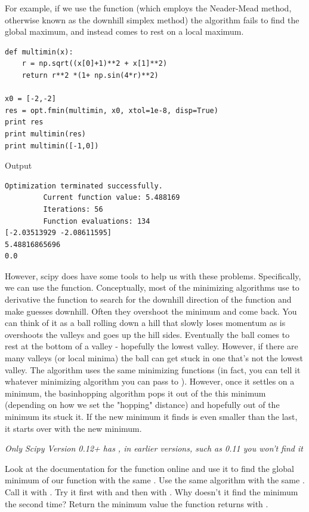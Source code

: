For example, if we use the  function (which employs the Neader-Mead method, otherwise known as the downhill simplex method) the algorithm fails to find the global maximum, and instead comes to rest on a local maximum.
\begin{lstlisting}
def multimin(x):
    r = np.sqrt((x[0]+1)**2 + x[1]**2)
    return r**2 *(1+ np.sin(4*r)**2)

x0 = [-2,-2]
res = opt.fmin(multimin, x0, xtol=1e-8, disp=True)
print res
print multimin(res)
print multimin([-1,0])
\end{lstlisting}
Output
\begin{lstlisting}
Optimization terminated successfully.
         Current function value: 5.488169
         Iterations: 56
         Function evaluations: 134
[-2.03513929 -2.08611595]
5.48816865696
0.0
\end{lstlisting}

However, scipy does have some tools to help us with these problems. Specifically, we can use the  function. 
Conceptually, most of the minimizing algorithms use to derivative the function to search for the downhill direction of the function and make guesses downhill. Often they overshoot the minimum and come back. You can think of it as a ball rolling down a hill that slowly loses momentum as is overshoots the valleys and goes up the hill sides. Eventually the ball comes to rest at the bottom of a valley - hopefully the lowest valley. However, if there are many valleys (or local minima) the ball can get stuck in one that's not the lowest valley.
The  algorithm uses the same minimizing functions (in fact, you can tell it whatever minimizing algorithm you can pass to ). However, once it settles on a minimum, the basinhopping algorithm pops it out of the this minimum (depending on how we set the "hopping" distance)  and hopefully out of the minimum its stuck it. If the new minimum it finds is even smaller than the last, it starts over with the new minimum.

\emph{Only Scipy Version 0.12+ has , in earlier versions, such as 0.11 you won't find it}
\begin{problem}

Look at the documentation for the  function online and use it to find the global minimum of our function with the same . Use the same  algorithm with the same . Call it with .
Try it first with  and then with . Why doesn't it find the minimum the second time? Return the minimum value the function returns with .

\end{problem}

